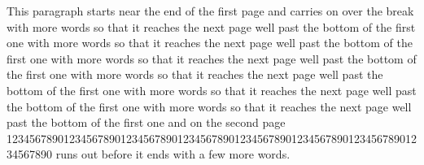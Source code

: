 \documentclass{article}
\begin{document}
\vspace*{17cm}

This paragraph starts near the end of the first page and carries on over the break
with more words so that it reaches the next page well past the bottom of the first one
with more words so that it reaches the next page well past the bottom of the first one
with more words so that it reaches the next page well past the bottom of the first one
with more words so that it reaches the next page well past the bottom of the first one
with more words so that it reaches the next page well past the bottom of the first one
with more words so that it reaches the next page well past the bottom of the first one
and on the second page 12345678901234567890123456789012345678901234567890123456789012345678901234567890 runs out
before it ends with a few more words.
\end{document}
